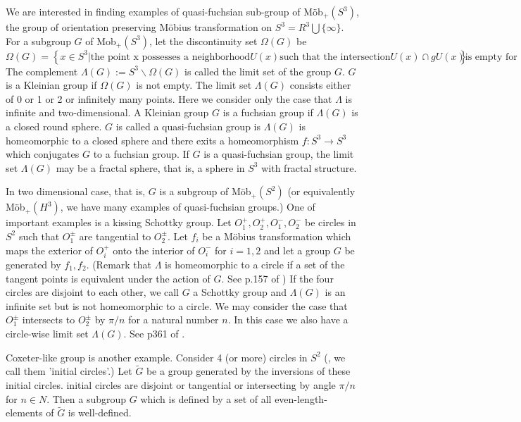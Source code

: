 \documentclass[dvipdfmx]{interact}
\theoremstyle{plain}%
\theoremstyle{definition}
\theoremstyle{remark}
\theoremstyle{problemstyle}
\begin{document}
We are interested in finding examples of quasi-fuchsian sub-group of
M\"ob$_{+}(S^3)$, the group of orientation preserving M\"obius
transformation on $S^3 = R^3 \bigcup \{\infty\}$. For a subgroup $G$ of
Mob$_+(S^3)$, let the discontinuity set $\Omega(G)$ be
$$
\Omega(G) = \left\{ x \in S^3 \left| \text{the point x possesses a neighborhood} U(x)
\text{such that the intersection} U(x) \cap gU(x) \text{is empty for all but finite
elements} g\in G \right. \right\}.
$$
The complement $\Lambda(G) := S^3 \backslash \Omega(G)$ is called the
limit set of the group $G$. $G$ is a Kleinian group if $\Omega(G)$ is
not empty. The limit set $\Lambda(G)$ consists either of 0 or 1 or 2 or
infinitely many points. Here we consider only the case that $\Lambda$
is infinite and two-dimensional. A Kleinian group $G$ is a fuchsian
group if $\Lambda(G)$ is a closed round sphere. $G$ is called a
quasi-fuchsian group is $\Lambda(G)$ is homeomorphic to a closed sphere
and there exits a homeomorphism $f:S^3 \rightarrow S^3$ which conjugates
$G$ to a fuchsian group. If $G$ is a quasi-fuchsian group, the limit set
$\Lambda(G)$ may be a fractal sphere, that is, a sphere in $S^3$ with
fractal structure.

In two dimensional case, that is, $G$ is a subgroup of M\"ob$_+(S^2)$
(or equivalently M\"ob$_+(H^3)$, we have many examples of quasi-fuchsian
groups.) One of important examples is a kissing Schottky group.
Let $O_1^+, O_2^+, O_1^-, O_2^-$ be circles in $S^2$ such that
$O_1^{\pm}$ are tangential to $O_2^{\pm}$. Let $f_i$ be a M\"obius
transformation which maps the exterior of $O_i^+$ onto the interior of
$O_i^{-}$ for $i = 1, 2$ and let a group $G$ be generated by $f_1, f_2$.
(Remark that $\Lambda$ is homeomorphic to a circle if a set of the
tangent points is equivalent under the action of $G$. See p.157 of
\cite{indra})
If the four circles are disjoint to each
other, we call $G$ a Schottky group and $\Lambda(G)$ is an infinite set
but is not homeomorphic to a circle. We may consider the case that
$O_1^{\pm}$ intersects to $O_2^{\pm}$ by $\pi/n$ for a natural number
$n$. In this case we also have a circle-wise limit set $\Lambda(G)$.
See p361 of \cite{indra}.

Coxeter-like group is another example. Consider 4 (or more) circles in
$S^2$ (, we call them 'initial circles'.) Let $\tilde G$ be a group generated
by the inversions of these initial circles.%
initial circles are disjoint or tangential or intersecting  by angle
$\pi/n$ for $n \in N$. Then a subgroup $G$ which is defined by a set of
all even-length-elements of $\tilde G$ is well-defined.
\end{document}
